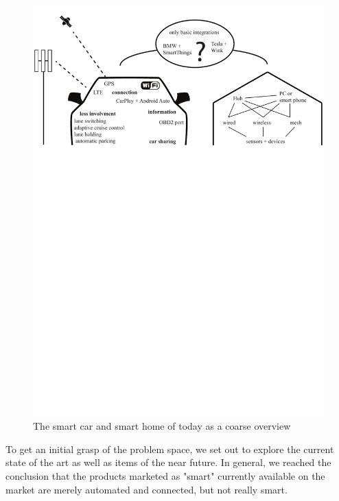 \begin{figure}[ht]
\centering
	\includegraphics[keepaspectratio, width=6in]{Figures/BenchmarkingOld/benchmarking_overview.pdf}
	\caption{The smart car and smart home of today as a coarse overview}
	\label{fig:benchmarking_overview}
\end{figure}

To get an initial grasp of the problem space, we set out to explore the current state of the art as well as items of the near future. In general, we reached the conclusion that the products marketed as "smart" currently available on the market are merely automated and connected, but not really smart. 

